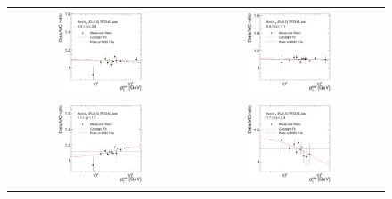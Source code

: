 \begin{description}
\begin{figure}[!htp]
  \centering
  \begin{tabular}{cc}
                \includegraphics[width=0.49\textwidth]{figures/Pythia_NSCFit_Eta0_kNS_kC_ratio.pdf} &
                \includegraphics[width=0.49\textwidth]{figures/Pythia_NSCFit_Eta1_kNS_kC_ratio.pdf}\\
                \includegraphics[width=0.49\textwidth]{figures/Pythia_NSCFit_Eta2_kNS_kC_ratio.pdf} &
                \includegraphics[width=0.49\textwidth]{figures/Pythia_NSCFit_Eta3_kNS_kC_ratio.pdf} \\

\end{tabular}
\end{figure}
\end{description}
